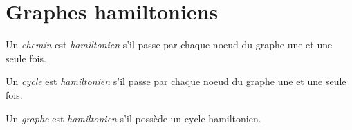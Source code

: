 \section{Graphes hamiltoniens}
\begin{mydef}
  Un \emph{chemin} est \emph{hamiltonien} s’il passe par chaque noeud du graphe une et une seule fois.
\end{mydef}

\begin{mydef}
  Un \emph{cycle} est \emph{hamiltonien} s’il passe par chaque noeud du graphe une et une seule fois.
\end{mydef}

\begin{mydef}
  Un \emph{graphe} est \emph{hamiltonien} s’il possède un cycle hamiltonien.
\end{mydef}

